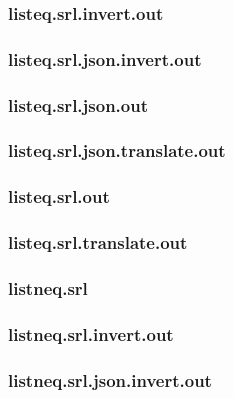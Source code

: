 \subsubsection{listeq.srl.invert.out}
\label{app:listeq_srl.invert.out}

\subsubsection{listeq.srl.json.invert.out}
\label{app:listeq_srl.json.invert.out}

\subsubsection{listeq.srl.json.out}
\label{app:listeq_srl.json.out}

\subsubsection{listeq.srl.json.translate.out}
\label{app:listeq_srl.json.translate.out}

\subsubsection{listeq.srl.out}
\label{app:listeq_srl.out}

\subsubsection{listeq.srl.translate.out}
\label{app:listeq_srl.translate.out}

\subsubsection{listneq.srl}
\label{app:listneq_srl}

\subsubsection{listneq.srl.invert.out}
\label{app:listneq_srl.invert.out}

\subsubsection{listneq.srl.json.invert.out}
\label{app:listneq_srl.json.invert.out}


